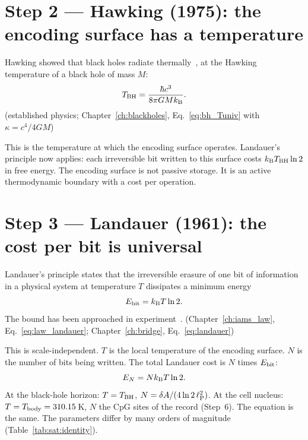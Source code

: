 \section{Step 2 --- Hawking (1975): the encoding surface has a temperature}\label{app:sat:step2}
Hawking showed that black holes radiate thermally~\cite{Hawking1975}, at the Hawking temperature of a black hole of mass $M$:
\begin{equation}
T_{\rm BH}=\frac{\hbar c^3}{8\pi GMk_{\mathrm B}}. \label{eq:sat_TBH}
\end{equation}
\derived{} (established physics; Chapter~\ref{ch:blackholes}, Eq.~\eqref{eq:bh_Tuniv} with $\kappa=c^4/4GM$)

This is the temperature at which the encoding surface operates. Landauer's principle now applies: each irreversible bit written to this surface
costs $k_{\mathrm B} T_{\rm BH}\ln2$ in free energy. The encoding surface is not passive storage. It is an active thermodynamic boundary with a cost per
operation.

\section{Step 3 --- Landauer (1961): the cost per bit is universal}\label{app:sat:step3}
Landauer's principle states that the irreversible erasure of one bit of information in a physical system at temperature $T$ dissipates a minimum
energy~\cite{Landauer1961}
\begin{equation}
E_{\rm bit}=k_{\mathrm B} T\ln2 . \label{eq:sat_Ebit}
\end{equation}
\derived{} The bound has been approached in experiment~\cite{Berut2012}. \observed{} (Chapter~\ref{ch:iams_law}, Eq.~\eqref{eq:law_landauer};
Chapter~\ref{ch:bridge}, Eq.~\eqref{eq:landauer})

This is scale-independent. $T$ is the local temperature of the encoding surface. $N$ is the number of bits being written. The total Landauer cost
is $N$ times $E_{\rm bit}$:
\begin{equation}
E_N=Nk_{\mathrm B} T\ln2 . \label{eq:sat_EN}
\end{equation}
\derived{} At the black-hole horizon: $T=T_{\rm BH}$, $N=\delta A/(4\ln2\,\ell_{\mathrm P}^2)$. At the cell nucleus: $T=T_{\mathrm{body}}=310.15$\,K, $N$ the CpG sites of
the record (Step~6). The equation is the same. The parameters differ by many orders of magnitude (Table~\ref{tab:sat:identity}).

